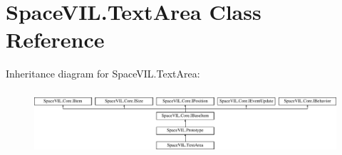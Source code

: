 \hypertarget{class_space_v_i_l_1_1_text_area}{}\section{Space\+V\+I\+L.\+Text\+Area Class Reference}
\label{class_space_v_i_l_1_1_text_area}
Inheritance diagram for Space\+V\+I\+L.\+Text\+Area\+:\begin{figure}[H]
\begin{center}
\leavevmode
\includegraphics[height=2.421622cm]{class_space_v_i_l_1_1_text_area}
\end{center}
\end{figure}
